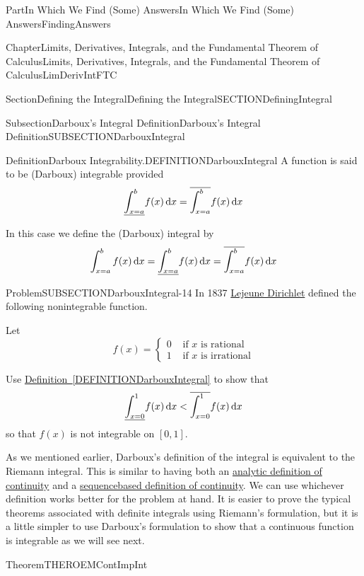 \documentclass[oneside,10pt,]{book}
\newcommand{\xreffont}{\relax}
\numberwithin{equation}{part}
\newcommand{\dx}[1]{\,{\rm d}#1}
\newcommand{\lt}{<}
\newcommand{\amp}{&}
\begin{document}
\begin{partptx}{Part}{In Which We Find (Some) Answers}{}{In Which We Find (Some) Answers}{}{}{FindingAnswers}
\begin{chapterptx}{Chapter}{Limits, Derivatives, Integrals, and the Fundamental Theorem of Calculus}{}{Limits, Derivatives, Integrals, and the Fundamental Theorem of Calculus}{}{}{LimDerivIntFTC}
\begin{sectionptx}{Section}{Defining the Integral}{}{Defining the Integral}{}{}{SECTIONDefiningIntegral}
\begin{subsectionptx}{Subsection}{Darboux's Integral Definition}{}{Darboux's Integral Definition}{}{}{SUBSECTIONDarbouxIntegral}
\begin{definition}{Definition}{Darboux Integrability.}{DEFINITIONDarbouxIntegral}%
A function is said to be (Darboux) integrable provided%
\begin{equation*}
\underline{\int^b_{x=a}}{f(x)}\dx{x}=\overline{\int^{b}_{x=a}}{f(x)\dx{x}}
\end{equation*}
%
\par
In this case we define the (Darboux) integral by%
\begin{equation*}
\int^b_{x=a}{f(x)\dx{x}}=\underline{\int^b_{x=a}}{f(x)}\dx{x}=\overline{\int^{b}_{x=a}}{f(x)\dx{x}}
\end{equation*}
%
\end{definition}
\begin{problem}{Problem}{}{SUBSECTIONDarbouxIntegral-14}%
In 1837 \href{https://mathshistory.st-andrews.ac.uk/Biographies/Dirichlet/}{Lejeune Dirichlet}\footnotemark{} defined the following non\textendash{}integrable function.%
\par
Let%
\begin{equation*}
f(x)=
\begin{cases}
0\amp \text{ if } x \text{ is rational}\\
1\amp \text{ if } x \text{ is irrational}
\end{cases}
\end{equation*}
%
\par
Use \hyperref[DEFINITIONDarbouxIntegral]{Definition~{\xreffont\ref{DEFINITIONDarbouxIntegral}}} to     show that%
\begin{equation*}
\underline{\int^1_{x=0}}{f(x)}\dx{x}\lt
\overline{\int^{1}_{x=0}}{f(x)\dx{x}}
\end{equation*}
so that \(f\left(x\right)\) is not integrable on \([0,1]\).%
\end{problem}
%
As we mentioned earlier, Darboux's definition of the integral is equivalent to the Riemann integral. This is similar to having both an \hyperref[def_continuity]{analytic definition of continuity} and a \hyperref[thm_LimDefOfContinuity]{sequence\textendash{}based definition of continuity}. We can use whichever definition works better for the problem at hand.  It is easier to prove the typical theorems associated with definite integrals using Riemann's formulation, but it is a little simpler to use Darboux's formulation to show that a continuous function is integrable as we will see next.%
\begin{theorem}{Theorem}{}{}{THEROEMContImpInt}%

\end{theorem}
\end{subsectionptx}
\end{sectionptx}
\end{chapterptx}
\end{partptx}
\end{document}
